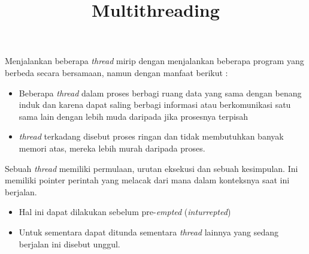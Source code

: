 \documentclass [12pt,a4paper,notitlepage,oneside,bahasa]{article}
\begin{document}
\title{\textbf Multithreading}
\maketitle

Menjalankan beberapa\textit{ thread} mirip dengan menjalankan beberapa program yang berbeda secara bersamaan, namun dengan manfaat berikut :
\begin{itemize}
	\item Beberapa \textit{thread} dalam proses berbagi ruang data yang sama dengan benang induk dan karena dapat saling berbagi informasi atau berkomunikasi satu sama lain dengan lebih muda daripada jika prosesnya terpisah \par
	\item \textit{thread} terkadang disebut proses ringan dan tidak membutuhkan banyak memori atas, mereka lebih murah daripada proses.
\end{itemize}

Sebuah \textit{thread} memiliki permulaan, urutan eksekusi dan sebuah kesimpulan. Ini memiliki pointer perintah yang melacak dari mana dalam konteksnya saat ini berjalan. \par
\begin{itemize}
	\item Hal ini dapat dilakukan sebelum pre-\textit{empted} (\textit{inturrepted})
	\item Untuk sementara dapat ditunda sementara \textit{thread} lainnya yang sedang berjalan ini disebut unggul. 
\end{itemize}
\noindent 
\end{document}
